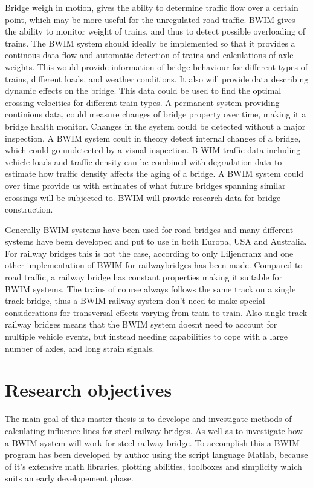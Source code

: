 Bridge weigh in motion, gives the abilty to determine traffic flow over a certain point, which may be more useful for the unregulated road traffic.
BWIM gives the ability to monitor weight of trains, and thus to detect possible overloading of trains.
The BWIM system should ideally be implemented so that it provides a continous data flow and automatic detection of trains and calculations of axle weights. This would provide information of bridge behaviour for different types of trains, different loads, and weather conditions. It also will provide data describing dynamic effects on the bridge. This data could be used to find the optimal crossing velocities for different train types.
A permanent system providing continious data, could measure changes of bridge property over time, making it a bridge health monitor. Changes in the system could be detected without a major inspection. A BWIM system coult in theory detect internal changes of a bridge, which could go undetected by a visual inspection.
B-WIM traffic data including vehicle loads and traffic density can be combined with degradation data to estimate how traffic density affects the aging of a bridge.
A BWIM system could over time provide us with estimates of what future bridges spanning similar crossings will be subjected to.
BWIM will provide research data for bridge construction.



Generally BWIM systems have been used for road bridges and many different systems have been developed and put to use in both Europa, USA and Australia. For railway bridges this is not the case, according to \cite{gonzales_applications} only Liljencranz \cite{Liljencrantz} and one other implementation of BWIM for railwaybridges has been made.
Compared to road traffic, a railway bridge has constant properties making it suitable for BWIM systems. The trains of course always follows the same track on a single track bridge, thus a BWIM railway system don't need to make special considerations for transversal effects varying from train to train. Also single track railway bridges means that the BWIM system doesnt need to account for multiple vehicle events, but instead needing capabilities to cope with a large number of axles, and long strain signals.

\section{Research objectives}
\label{researchObjective}
The main goal of this master thesis is to develope and investigate methods of calculating influence lines for steel railway bridges. As well as to investigate how a BWIM system will work for steel railway bridge.
To accomplish this a BWIM program has been developed by author using the script language Matlab, because of it's extensive math libraries, plotting abilities, toolboxes and simplicity which suits an early developement phase.

